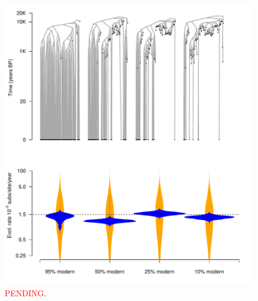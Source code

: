 \documentclass[11pt]{article}
\begin{document}
\begin{figure}[H]
    \begin{center}
        \includegraphics[scale=0.7, angle=0]{empirical_results_biased.pdf}
        \caption{\textcolor{red}{PENDING}.}
        \label{figure:Fig6}
    \end{center}
\end{figure}
\end{document}

